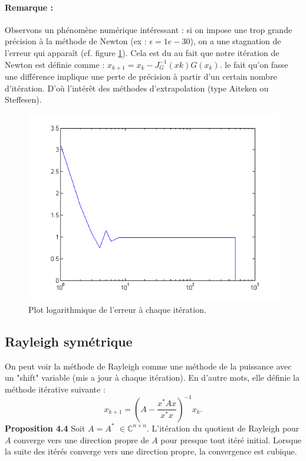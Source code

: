 \paragraph{Remarque : }
Observons un phénomène numérique intéressant : si on impose une trop grande précision à la méthode de Newton (ex : $\epsilon = 1e-30$), on a une stagnation de l'erreur qui apparaît (cf. figure \ref{plor_erreur}). Cela est du au fait que notre itération de Newton est définie comme : $x_{k+1} = x_k - J_G^{-1}(xk) G(x_k)$. le fait qu'on fasse une différence implique une perte de précision à partir d'un certain nombre d'itération. D'où l'intérêt des méthodes d'extrapolation (type Aiteken ou Steffesen). 

\begin{figure}
\includegraphics[width = 12cm]{erreur.png}
\caption{Plot logarithmique de l'erreur à chaque itération.}
\label{plor_erreur}
\end{figure}

\subsection*{Rayleigh symétrique}
On peut voir la méthode de Rayleigh comme une méthode de la puissance avec un "shift" variable (mis a jour à chaque itération). En d'autre mots, elle définie la méthode itérative suivante : 
$$x_{k+1} = \left(  A- \frac{x^*Ax}{x^*x}  \right)^{-1} x_k.  $$
\textbf{Proposition 4.4} Soit $A = A^*$ $ \in \mathbb{C}^{n\times n}$. L'itération du quotient de Rayleigh pour $A$ converge vers une direction propre de $A$ pour presque tout itéré initial. Lorsque la suite des itérés converge vers une direction propre, la convergence est cubique. 

